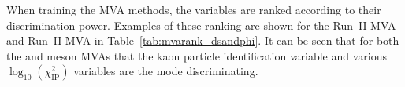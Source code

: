 When training the MVA methods, the variables are ranked according to their discrimination power. Examples of these ranking are shown for the Run~II \decay{\phiz}{\Kp\Km} MVA and Run~II \decay{\Dsp}{\Kp\Km\pip} MVA in Table~\ref{tab:mvarank_dsandphi}. It can be seen that for both the \Dsp and \phiz meson MVAs that the kaon particle identification variable and various $\log_{10}(\chi^{2}_{\text{IP}})$ variables are the mode discriminating.



